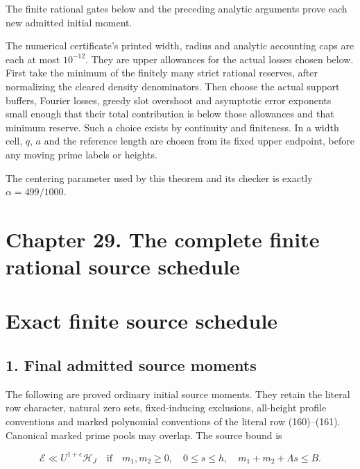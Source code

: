 The finite rational gates below and the preceding analytic arguments prove each new admitted initial moment.

The numerical certificate's printed width, radius and analytic accounting caps are each at most \(10^{-12}\). They are upper allowances for the actual losses chosen below. First take the minimum of the finitely many strict rational reserves, after normalizing the cleared density denominators. Then choose the actual support buffers, Fourier losses, greedy slot overshoot and asymptotic error exponents small enough that their total contribution is below those allowances and that minimum reserve. Such a choice exists by continuity and finiteness. In a width cell, \(q\), \(a\) and the reference length are chosen from its fixed upper endpoint, before any moving prime labels or heights.

The centering parameter used by this theorem and its checker is exactly \(\alpha=499/1000\).

\hypertarget{sources:chapter-29.-the-complete-finite-rational-source-schedule}{%
\section{Chapter 29. The complete finite rational source schedule}\label{sources:chapter-29.-the-complete-finite-rational-source-schedule}}

\hypertarget{sources:exact-finite-source-schedule}{%
\section{Exact finite source schedule}\label{sources:exact-finite-source-schedule}}

\hypertarget{sources:final-admitted-source-moments}{%
\subsection{1. Final admitted source moments}\label{sources:final-admitted-source-moments}}

The following are proved ordinary initial source moments. They retain the literal row character, natural zero sets, fixed-inducing exclusions, all-height profile conventions and marked polynomial conventions of the literal row (160)--(161). Canonical marked prime pools may overlap. The source bound is

\[
 \mathcal E\ll U^{1+\epsilon}\mathcal H_J
 \quad\text{if}\quad
 m_1,m_2\ge0,\quad 0\le s\le h,\quad
 m_1+m_2+\Lambda s\le B.
\tag{S1}
\]

